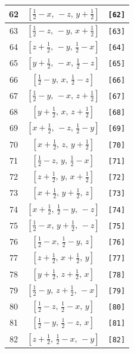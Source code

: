 \documentclass[fleqn,8pt]{jsarticle}
\begin{document}
\begin{longtable}{ccc}
62 & $\left[ \frac{1}{2} - x,\, - z,\, y + \frac{1}{2} \right]$ & {\tt [62]} \\ \hline
63 & $\left[ \frac{1}{2} - z,\, - y,\, x + \frac{1}{2} \right]$ & {\tt [63]} \\ \hline
64 & $\left[ z + \frac{1}{2},\, - y,\, \frac{1}{2} - x \right]$ & {\tt [64]} \\ \hline
65 & $\left[ y + \frac{1}{2},\, - x,\, \frac{1}{2} - z \right]$ & {\tt [65]} \\ \hline
66 & $\left[ \frac{1}{2} - y,\, x,\, \frac{1}{2} - z \right]$ & {\tt [66]} \\ \hline
67 & $\left[ \frac{1}{2} - y,\, - x,\, z + \frac{1}{2} \right]$ & {\tt [67]} \\ \hline
68 & $\left[ y + \frac{1}{2},\, x,\, z + \frac{1}{2} \right]$ & {\tt [68]} \\ \hline
69 & $\left[ x + \frac{1}{2},\, - z,\, \frac{1}{2} - y \right]$ & {\tt [69]} \\ \hline
70 & $\left[ x + \frac{1}{2},\, z,\, y + \frac{1}{2} \right]$ & {\tt [70]} \\ \hline
71 & $\left[ \frac{1}{2} - z,\, y,\, \frac{1}{2} - x \right]$ & {\tt [71]} \\ \hline
72 & $\left[ z + \frac{1}{2},\, y,\, x + \frac{1}{2} \right]$ & {\tt [72]} \\ \hline
73 & $\left[ x + \frac{1}{2},\, y + \frac{1}{2},\, z \right]$ & {\tt [73]} \\ \hline
74 & $\left[ x + \frac{1}{2},\, \frac{1}{2} - y,\, - z \right]$ & {\tt [74]} \\ \hline
75 & $\left[ \frac{1}{2} - x,\, y + \frac{1}{2},\, - z \right]$ & {\tt [75]} \\ \hline
76 & $\left[ \frac{1}{2} - x,\, \frac{1}{2} - y,\, z \right]$ & {\tt [76]} \\ \hline
77 & $\left[ z + \frac{1}{2},\, x + \frac{1}{2},\, y \right]$ & {\tt [77]} \\ \hline
78 & $\left[ y + \frac{1}{2},\, z + \frac{1}{2},\, x \right]$ & {\tt [78]} \\ \hline
79 & $\left[ \frac{1}{2} - y,\, z + \frac{1}{2},\, - x \right]$ & {\tt [79]} \\ \hline
80 & $\left[ \frac{1}{2} - z,\, \frac{1}{2} - x,\, y \right]$ & {\tt [80]} \\ \hline
81 & $\left[ \frac{1}{2} - y,\, \frac{1}{2} - z,\, x \right]$ & {\tt [81]} \\ \hline
82 & $\left[ z + \frac{1}{2},\, \frac{1}{2} - x,\, - y \right]$ & {\tt [82]} \\ \hline

\end{longtable}
\end{document}
